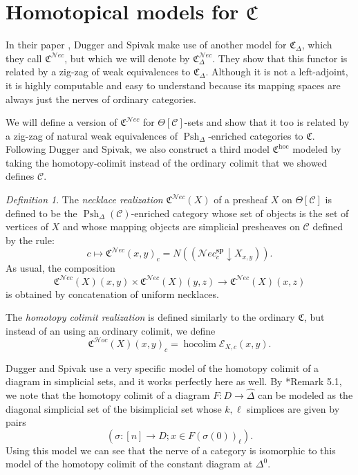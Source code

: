 \documentclass{amsart}
\numberwithin{equation}{section}
\theoremstyle{plain}   %
\theoremstyle{remark}
\newtheorem{defn}[subsection]{Definition}
\theoremstyle{plain}
\DeclareMathOperator{\Psh}{Psh}
\newcommand{\Nec}{\ensuremath{{\mathcal{N}ec}}}
\newcommand{\Hoc}{\ensuremath{{\mathcal{H}oc}}}
\newcommand{\overcat}[2]{{(#1\downarrow #2)}}
\DeclareMathOperator{\hocolim}{hocolim}
\newcommand{\psh}[1]{\ensuremath{\widehat{#1}}}
\newcommand{\C}{\ensuremath{\mathcal{C}}}
\begin{document}
\section{Homotopical models for \(\mathfrak{C}\)}
In their paper \cite{ds1}, Dugger and Spivak make use of another model for \(\mathfrak{C}_\Delta\), which they call \(\mathfrak{C}^\Nec\), but which we will denote by \(\mathfrak{C}_\Delta^\Nec\).  They show that this functor is related by a zig-zag of weak equivalences to \(\mathfrak{C}_\Delta\).  Although it is not a left-adjoint, it is highly computable and easy to understand because its mapping spaces are always just the nerves of ordinary categories.

We will define a version of \(\mathfrak{C}^\Nec\) for \(\Theta[\C]\)-sets and show that it too is related by a zig-zag of natural weak equivalences of \(\Psh_\Delta\)-enriched categories to \(\mathfrak{C}\). Following Dugger and Spivak, we also construct a third model \(\mathfrak{C}^{\operatorname{hoc}}\) modeled by taking the homotopy-colimit instead of the ordinary colimit that we showed defines \(\mathcal{C}\).

\begin{defn}
	The \emph{necklace realization} \(\mathfrak{C}^\Nec(X)\) of a presheaf \(X\) on \(\Theta[\C]\) is defined to be the \(\Psh_\Delta(\C)\)-enriched category whose set of objects is the set of vertices of \(X\) and whose mapping objects are simplicial presheaves on \(\C\) defined by the rule:
	\[c\mapsto \mathfrak{C}^\Nec(x,y)_c=N(\overcat{\Nec^\mathbf{sp}_c}{X_{x,y}}).\]
	As usual, the composition \[\mathfrak{C}^\Nec(X)(x,y)\times \mathfrak{C}^\Nec(X)(y,z)\to \mathfrak{C}^\Nec(X)(x,z)\] is obtained by concatenation of uniform necklaces.

	The \emph{homotopy colimit realization} is defined similarly to the ordinary \(\mathfrak{C}\), but instead of an using an ordinary colimit, we define \[\mathfrak{C}^\Hoc(X)(x,y)_c=\hocolim\mathcal{E}_{X,c}(x,y).\]
\end{defn}

Dugger and Spivak use a very specific model of the homotopy colimit of a diagram in simplicial sets, and it works perfectly here as well.  By \cite{ds1}*{Remark 5.1}, we note that the homotopy colimit of a diagram \(F:D\to \psh{\Delta}\) can be modeled as the diagonal simplicial set of the bisimplicial set whose \(k,\ell\) simplices are given by pairs \[(\sigma:[n]\to D; x \in F(\sigma(0))_\ell).\]  Using this model we can see that the nerve of a category is isomorphic to this model of the homotopy colimit of the constant diagram at \(\Delta^0\).
\end{document}
